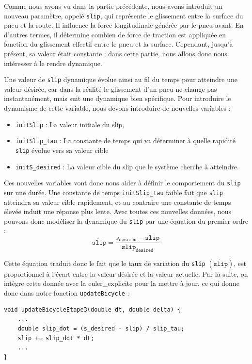 Comme nous avons vu dans la partie précédente, nous avons introduit un nouveau paramètre, appelé \texttt{slip}, qui représente le glissement entre la surface du pneu et la route.
Il influence la force longitudinale générée par le pneu avant.
En d'autres termes, il détermine combien de force de traction est appliquée en fonction du glissement effectif entre le pneu et la surface.
Cependant, jusqu'à présent, sa valeur était constante ; dans cette partie, nous allons donc nous intéresser à le rendre dynamique.

Une valeur de \texttt{slip} dynamique évolue ainsi au fil du temps pour atteindre une valeur désirée, car dans la réalité le glissement d'un pneu ne change pas instantanément, mais suit une dynamique bien spécifique.
Pour introduire le dynamisme de cette variable, nous devons introduire de nouvelles variables :

\begin{itemize}
\item \texttt{initSlip} : La valeur initiale du slip,

\item \texttt{initSlip\_tau} : La constante de temps qui va déterminer à quelle rapidité \texttt{slip} évolue vers sa valeur cible

\item \texttt{initS\_desired} : La valeur cible du slip que le système cherche à atteindre.

\end{itemize}

Ces nouvelles variables vont donc nous aider à définir le comportement du \texttt{slip} sur une durée.
Une constante de temps \texttt{initSlip\_tau} faible fait que \texttt{slip} atteindra sa valeur cible rapidement, et au contraire une constante de temps élevée induit une réponse plus lente.
Avec toutes ces nouvelles données, nous pouvons donc modéliser la dynamique du \texttt{slip} par une équation du premier ordre :
$$\dot{\texttt{slip}} = \frac{s_{\texttt{desired}} - \texttt{slip}}{\texttt{slip}_{\texttt{desired}}}$$

Cette équation traduit donc le fait que le taux de variation du \texttt{slip} $(\dot{\texttt{slip}})$, est proportionnel à l'écart entre la valeur désirée et la valeur actuelle.
Par la suite, on intègre cette donnée avec la \gls{euler_explicite} pour la mettre à jour, ce qui donne donc dans notre fonction \texttt{updateBicycle} :

\begin{lstlisting}[style=CStyle,label={lst:code_update_bicycle_etape3}]
void updateBicycleEtape3(double dt, double delta) {
    ...
    double slip_dot = (s_desired - slip) / slip_tau;
    slip += slip_dot * dt;
    ...
}
\end{lstlisting}

